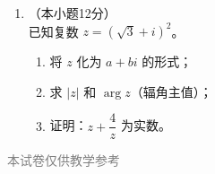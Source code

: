 \documentclass[12pt, a4paper]{ctexart}
\begin{document}
\begin{enumerate}[resume]
\vspace{6cm}

\item[22.]（本小题12分）\\
已知复数 $z=(\sqrt{3}+i)^2$。
\begin{enumerate}[(1)]
  \item 将 $z$ 化为 $a+bi$ 的形式；
  \item 求 $|z|$ 和 $\arg z$（辐角主值）；
  \item 证明：$z+\dfrac{4}{z}$ 为实数。
\end{enumerate}

\vspace{6cm}
\end{enumerate}

\vfill
\begin{center}
\small\textcolor{gray}{本试卷仅供教学参考}
\end{center}
\end{document}
